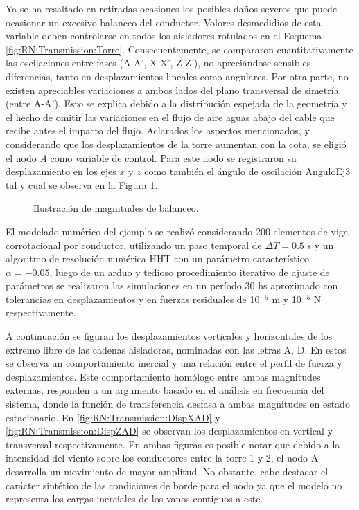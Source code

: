 Ya se ha resaltado en retiradas ocasiones los posibles daños severos que puede ocasionar un excesivo balanceo del conductor. Volores desmedidios de esta variable deben controlarse en todos los aisladores rotulados en el Esquema \ref{fig:RN:Transmission:Torre}. Consecuentemente, se compararon cuantitativamente las oscilaciones entre fases (A-A', X-X', Z-Z'), no apreciándose sensibles diferencias, tanto en desplazamientos lineales como angulares. Por otra parte, no existen apreciables variaciones a ambos lados del plano transversal de simetría (entre A-A'). Esto se explica debido a la distribución espejada de la geometría y el hecho de omitir las variaciones en el flujo de aire aguas abajo del cable que recibe antes el impacto del flujo. Aclarados los aspectos mencionados, y considerando que los desplazamientos de la torre aumentan con la cota, se eligió el nodo \textit{A} como variable de control. Para este nodo se registraron su desplazamiento en los ejes $x$ y $z$ como también el ángulo de oscilación \gls{AnguloEj3} tal y cual se observa en la Figura \ref{fig:RN:Transmission:Angulo}.

\begin{figure}[htbp]
	\centering
	\def\svgwidth{80mm}
	
	\caption{Ilustración de magnitudes de balanceo.}
	\label{fig:RN:Transmission:Angulo}
\end{figure}

El modelado numérico del ejemplo se realizó considerando 200 elementos de viga corrotacional por conductor, utilizando un paso temporal de $\Delta T =0.5$ s y un algoritmo de resolución numérica HHT con un parámetro característico $\alpha=-0.05$, luego de un arduo y tedioso procedimiento iterativo de ajuste de parámetros se realizaron las simulaciones en un período 30 hs aproximado con tolerancias en desplazamientos y en fuerzas residuales de 10$^{-5}$ m y 10$^{-5}$ N respectivamente.

A continuación se figuran los desplazamientos verticales y horizontales de los extremo libre de las cadenas aisladoras, nominadas con las letras $\text{A}$, $\text{D}$. En estos se observa un comportamiento inercial y una relación entre el perfil de fuerza y desplazamientos. Este comportamiento homólogo entre ambas magnitudes externas, responden a un argumento basado en el análisis en frecuencia del sistema, donde la función de transferencia desfasa a ambas magnitudes en estado estacionario. En \ref{fig:RN:Transmission:DispXAD} y \ref{fig:RN:Transmission:DispZAD} se observan los desplazamientos en vertical y transversal respectivamente. En ambas figuras es posible notar que debido a la intensidad del viento sobre los conductores entre la torre 1 y 2, el nodo $\text{A}$ desarrolla un movimiento de mayor amplitud. No obstante, cabe destacar el carácter sintético de las condiciones de borde para el nodo ya que el modelo no representa los cargas inerciales de los vanos contiguos a este. 



